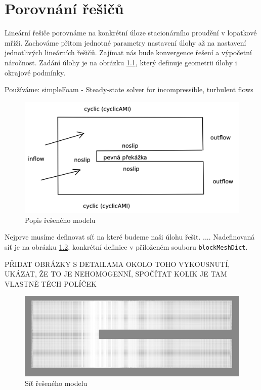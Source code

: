 \documentclass[a4paper,12pt]{report}
\theoremstyle{remark}
\begin{document}
	{\let\clearpage\relax \chapter{Porovnání řešičů}}
	
	Lineární řešiče porovnáme na konkrétní úloze stacionárního proudění v lopatkové mříži. Zachováme přitom jednotné parametry nastavení úlohy až na nastavení jednotlivých lineárních řešičů. Zajímat nás bude konvergence řešení a výpočetní náročnost. Zadání úlohy je na obrázku \ref{fig:zadani}, který definuje geometrii úlohy i okrajové podmínky. 
	
	Používáme: simpleFoam - Steady-state solver for incompressible, turbulent flows
	
	\begin{figure}[H]
		\centering
		\includegraphics[width=1\linewidth]{zadani.png}
		\caption{Popis řešeného modelu}
		\label{fig:zadani}
	\end{figure}


Nejprve musíme definovat síť na které budeme naši úlohu řešit. .... Nadefinovaná síť je na obrázku \ref{fig:pvmesh}, konkrétní definice v přiloženém souboru \texttt{blockMeshDict}.

PŘIDAT OBRÁZKY S DETAILAMA OKOLO TOHO VYKOUSNUTÍ, UKÁZAT, ŽE TO JE NEHOMOGENNÍ, SPOČÍTAT KOLIK JE TAM VLASTNĚ TĚCH POLÍČEK

\begin{figure}[H]
	\centering
	\includegraphics[width=1\linewidth]{pv-mesh.png}
	\caption{Síť řešeného modelu}
	\label{fig:pvmesh}
\end{figure}
\end{document}
